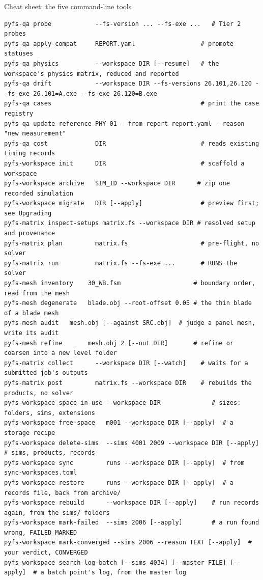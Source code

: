 \documentclass[aspectratio=169,10pt]{beamer}
\begin{document}
\begin{frame}{Cheat sheet: the five command-line tools}
\begin{lstlisting}[style=txt]
pyfs-qa probe            --fs-version ... --fs-exe ...   # Tier 2 probes
pyfs-qa apply-compat     REPORT.yaml                  # promote statuses
pyfs-qa physics          --workspace DIR [--resume]   # the workspace's physics matrix, reduced and reported
pyfs-qa drift            --workspace DIR --fs-versions 26.101,26.120 --fs-exe 26.101=A.exe --fs-exe 26.120=B.exe
pyfs-qa cases                                         # print the case registry
pyfs-qa update-reference PHY-01 --from-report report.yaml --reason "new measurement"
pyfs-qa cost             DIR                          # reads existing timing records
pyfs-workspace init      DIR                          # scaffold a workspace
pyfs-workspace archive   SIM_ID --workspace DIR      # zip one recorded simulation
pyfs-workspace migrate   DIR [--apply]                # preview first; see Upgrading
pyfs-matrix inspect-setups matrix.fs --workspace DIR # resolved setup and provenance
pyfs-matrix plan         matrix.fs                    # pre-flight, no solver
pyfs-matrix run          matrix.fs --fs-exe ...       # RUNS the solver
pyfs-mesh inventory    30_WB.fsm                    # boundary order, read from the mesh
pyfs-mesh degenerate   blade.obj --root-offset 0.05 # the thin blade of a blade mesh
pyfs-mesh audit   mesh.obj [--against SRC.obj]  # judge a panel mesh, write its audit
pyfs-mesh refine       mesh.obj 2 [--out DIR]       # refine or coarsen into a new level folder
pyfs-matrix collect      --workspace DIR [--watch]    # waits for a submitted job's outputs
pyfs-matrix post         matrix.fs --workspace DIR    # rebuilds the products, no solver
pyfs-workspace space-in-use --workspace DIR              # sizes: folders, sims, extensions
pyfs-workspace free-space   m001 --workspace DIR [--apply]  # a storage recipe
pyfs-workspace delete-sims  --sims 4001 2009 --workspace DIR [--apply]  # sims, products, records
pyfs-workspace sync         runs --workspace DIR [--apply]  # from sync-workspaces.toml
pyfs-workspace restore      runs --workspace DIR [--apply]  # a records file, back from archive/
pyfs-workspace rebuild      --workspace DIR [--apply]    # run records again, from the sims/ folders
pyfs-workspace mark-failed  --sims 2006 [--apply]        # a run found wrong, FAILED_MARKED
pyfs-workspace mark-converged --sims 2006 --reason TEXT [--apply]  # your verdict, CONVERGED
pyfs-workspace search-log-batch [--sims 4034] [--master FILE] [--apply]  # a batch point's log, from the master log

\end{lstlisting}
\end{frame}
\end{document}

